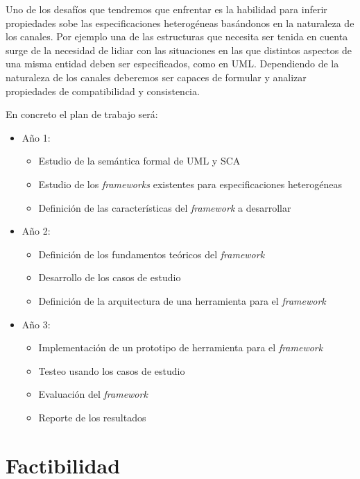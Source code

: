 \documentclass[a4paper, 11pt]{article}
\begin{document}
Uno de los desafíos que tendremos que enfrentar es la habilidad para inferir propiedades sobe las especificaciones heterogéneas basándonos en la naturaleza de los canales. Por ejemplo una de las estructuras que necesita ser tenida en cuenta surge de la necesidad de lidiar con las situaciones en las que distintos aspectos de una misma entidad deben ser especificados, como en UML. Dependiendo de la naturaleza de los canales deberemos ser capaces de formular y analizar propiedades de compatibilidad y consistencia.

\noindent En concreto el plan de trabajo será:

\begin{itemize}
 \item Año 1:
 \begin{itemize}
  \item Estudio de la semántica formal de UML y SCA
  \item Estudio de los \emph{frameworks} existentes para especificaciones heterogéneas
  \item Definición de las características del \emph{framework} a desarrollar
 \end{itemize}

 \item Año 2:
 \begin{itemize}
  \item Definición de los fundamentos teóricos del \emph{framework}
  \item Desarrollo de los casos de estudio
  \item Definición de la arquitectura de una herramienta para el \emph{framework}
 \end{itemize}
 
 \item Año 3:
 \begin{itemize}
  \item Implementación de un prototipo de herramienta para el \emph{framework}
  \item Testeo usando los casos de estudio
  \item Evaluación del \emph{framework}
  \item Reporte de los resultados
 \end{itemize}


\end{itemize}


\section{Factibilidad}
\end{document}
